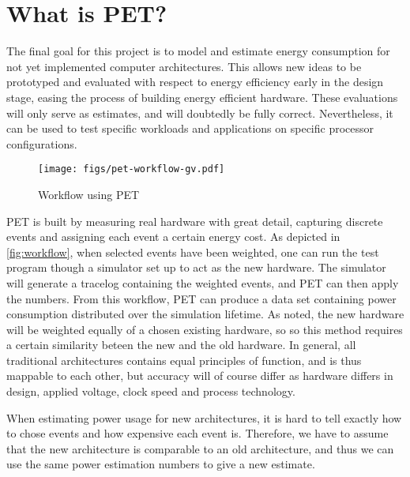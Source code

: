 \section{What is PET?}

The final goal for this project is to model and estimate energy consumption
for not yet implemented computer architectures. This allows new ideas to be prototyped
and evaluated with respect to energy efficiency early in the design stage,
easing the process of building energy efficient hardware. These evaluations will
only serve as estimates, and will doubtedly be fully correct. Nevertheless, it
can be used to test specific workloads and applications on specific processor
configurations.

\begin{figure}
    \texttt{[image: figs/pet-workflow-gv.pdf]}
    \caption{Workflow using PET}
    \label{fig:workflow}
\end{figure}

PET is built by measuring real hardware with great detail, capturing discrete
events and assigning each event a certain energy cost. As depicted in
\autoref{fig:workflow}, when selected events have been weighted, one can run the
test program though a simulator set up to act as the new hardware. The simulator
will generate a tracelog containing the weighted events, and PET can then apply
the numbers. From this workflow, PET can produce a data set containing power
consumption distributed over the simulation lifetime. As noted, the new hardware
will be weighted equally of a chosen existing hardware, so so this method
requires a certain similarity beteen the new and the old hardware. In general,
all traditional architectures contains equal principles of function, and is thus
mappable to each other, but accuracy will of course differ as hardware differs
in design, applied voltage, clock speed and process technology.

When estimating power usage for new architectures, it is hard to tell exactly
how to chose events and how expensive each event is. Therefore, we have to
assume that the new architecture is comparable to an old architecture, and thus
we can use the same power estimation numbers to give a new estimate.
